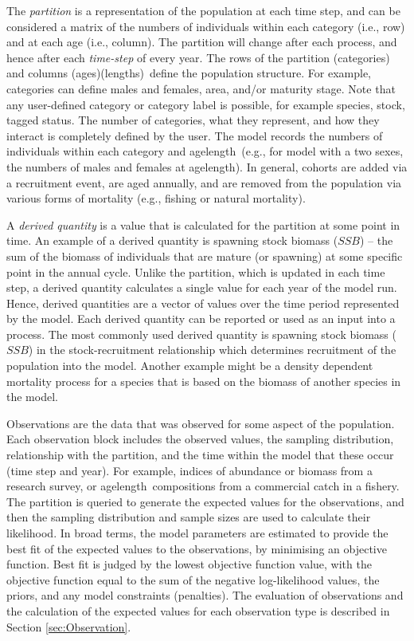 The \emph{partition} is a representation of the population at each time step, and can be considered a matrix of the numbers of individuals within each category (i.e., row) and at each age (i.e., column). The partition will change after each process, and hence after each \emph{time-step} of every year. The rows of the partition (categories) and columns \ifAgeBased(ages)\else(lengths)\fi \ define the population structure. For example, categories can define males and females, area, and/or maturity stage. Note that any user-defined category or category label is possible, for example species, stock, tagged status. The number of categories, what they represent, and how they interact is completely defined by the user. The model records the numbers of individuals within each category and \ifAgeBased age\else length\fi \  (e.g., for model with a two sexes, the numbers of males and females at \ifAgeBased age\else length\fi ). In general, cohorts are added via a recruitment event, are aged annually, and are removed from the population via various forms of mortality (e.g., fishing or natural mortality).

A \emph{derived quantity} is a value that is calculated for the partition at some point in time. An example of a derived quantity is spawning stock biomass ($SSB$) -- the sum of the biomass of individuals that are mature (or spawning) at some specific point in the annual cycle. Unlike the partition, which is updated in each time step, a derived quantity calculates a single value for each year of the model run. Hence, derived quantities are a vector of values over the time period represented by the model. Each derived quantity can be reported or used as an input into a process. The most commonly used derived quantity is spawning stock biomass ($SSB$) in the stock-recruitment relationship which determines recruitment of the population into the model. Another example might be a density dependent mortality process for a species that is based on the biomass of another species in the model.

Observations are the data that was observed for some aspect of the population. Each observation block includes the observed values, the sampling distribution, relationship with the partition, and the time within the model that these occur (time step and year). For example, indices of abundance or biomass from a research survey, or \ifAgeBased age\else length\fi \ compositions from a commercial catch in a fishery. The partition is queried to generate the expected values for the observations, and then the sampling distribution and sample sizes are used to calculate their likelihood. In broad terms, the model parameters are estimated to provide the best fit of the expected values to the observations, by minimising an objective function. Best fit is judged by the lowest objective function value, with the objective function equal to the sum of the negative log-likelihood values, the priors, and any model constraints (penalties). The evaluation of observations and the calculation of the expected values for each observation type is described in Section \ref{sec:Observation}.

